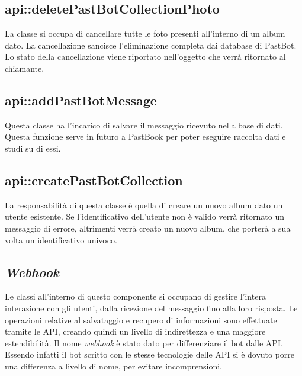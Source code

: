 \subsection{api::deletePastBotCollectionPhoto}

La classe si occupa di cancellare tutte le foto presenti all'interno di un
album dato. La cancellazione sancisce l'eliminazione completa dai database di
PastBot.
Lo stato della cancellazione viene riportato nell'oggetto che verrà ritornato
al chiamante.

\subsection{api::addPastBotMessage}

Questa classe ha l'incarico di salvare il messaggio ricevuto nella base di
dati. Questa funzione serve in futuro a PastBook per poter eseguire raccolta
dati e studi su di essi.

\subsection{api::createPastBotCollection}

La responsabilità di questa classe è quella di creare un nuovo album dato un
utente esistente. Se l'identificativo dell'utente non è valido verrà ritornato
un messaggio di errore, altrimenti verrà creato un nuovo album, che porterà a
sua volta un identificativo univoco.

\subsection{\textit{Webhook}}

Le classi all'interno di questo componente si occupano di gestire l'intera
interazione con gli utenti, dalla ricezione del messaggio fino alla loro
risposta. Le operazioni relative al salvataggio e recupero di informazioni sono
effettuate tramite le API, creando quindi un livello di indirettezza e una
maggiore estendibilità.
Il nome \textit{webhook} è stato dato per differenziare il bot dalle API.
Essendo infatti il bot scritto con le stesse tecnologie delle API si è dovuto
porre una differenza a livello di nome, per evitare incomprensioni.

